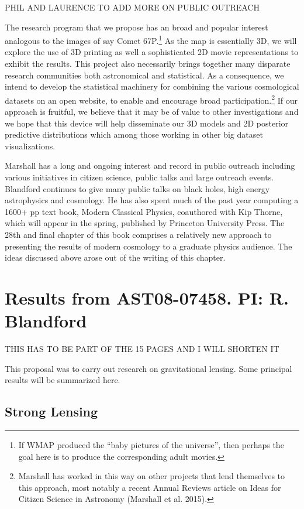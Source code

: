 \documentclass[psfig,11pt]{article}
\begin{document}
{PHIL  AND LAURENCE TO ADD MORE ON PUBLIC OUTREACH

The research program that we propose has an broad and popular interest analogous to the images of say Comet 67P.\footnote{If WMAP produced the ``baby pictures of the universe'', then perhaps the goal here is to produce the corresponding adult movies.} As the map is essentially 3D, we will explore the use of 3D printing as well a sophisticated 2D movie representations to exhibit the results. This project also necessarily brings together many disparate research communities both astronomical and statistical. As a consequence, we intend to develop the statistical machinery for combining the various cosmological datasets on an open website, to enable and encourage broad participation.\footnote{Marshall has worked in this way on other projects that lend themselves to this approach, most notably a recent Annual Reviews article on Ideas for Citizen Science in Astronomy (Marshall et al. 2015).} If our approach is fruitful, we believe that it may be of value to other investigations and we hope that this device will help disseminate our 3D models and 2D posterior predictive distributions which among those working in other big dataset visualizations.

Marshall has a long and ongoing interest and record in public outreach including various initiatives in citizen science, public talks and large outreach events.  Blandford continues to give many public talks on black holes, high energy astrophysics and cosmology. He has also spent much of the past year computing a 1600+ pp text book, Modern Classical Physics, coauthored with Kip Thorne, which will appear in the spring, published by Princeton University Press. The 28th and final chapter of this book comprises a relatively new approach to presenting the results of modern cosmology to a graduate physics audience. The ideas discussed above arose out of the writing of this chapter.



\section{Results from AST08-07458. PI: R. Blandford}

THIS HAS TO BE PART OF THE 15 PAGES AND I WILL SHORTEN IT

This proposal was to carry out research on gravitational lensing. Some principal results will be summarized here.
\subsection{Strong Lensing}
}
\end{document}
